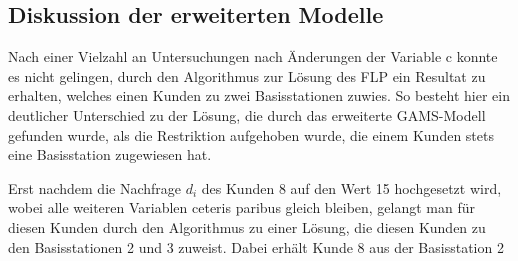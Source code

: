 \documentclass[a4paper,12pt,parskip,bibtotoc,liststotoc]{article}
\begin{document}
%
%
%
%
%



\subsection{Diskussion der erweiterten Modelle}

Nach einer Vielzahl an Untersuchungen nach Änderungen der Variable c konnte es nicht gelingen, durch den Algorithmus zur Lösung des FLP ein Resultat zu erhalten, welches einen Kunden zu zwei Basisstationen zuwies.
So besteht hier ein deutlicher Unterschied zu der Lösung, die durch das erweiterte GAMS-Modell gefunden wurde, als die Restriktion aufgehoben wurde, die einem Kunden stets eine Basisstation zugewiesen hat. 

Erst nachdem die Nachfrage $d_{i}$ des Kunden 8 auf den Wert 15 hochgesetzt wird, wobei alle weiteren Variablen ceteris paribus gleich bleiben, gelangt man für diesen Kunden durch den Algorithmus zu einer Lösung, die diesen Kunden zu den Basisstationen 2 und 3 zuweist.
Dabei erhält Kunde 8 aus der Basisstation 2



\newpage
\end{document}
